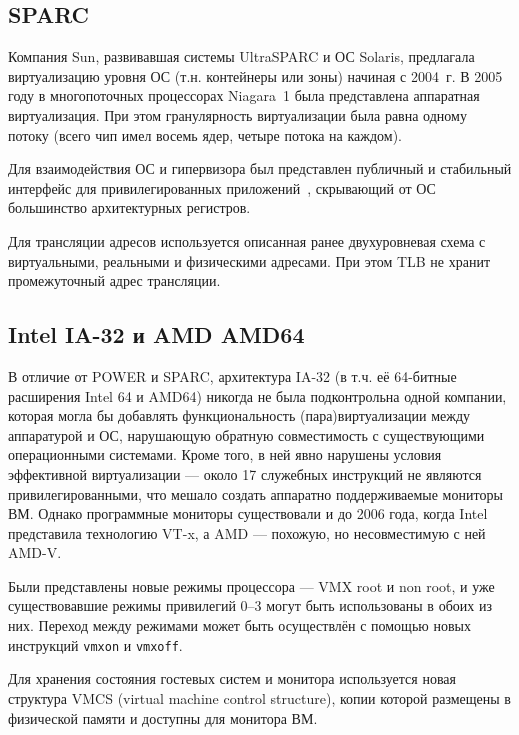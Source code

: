 \subsection{SPARC}

Компания Sun, развивавшая системы UltraSPARC и ОС Solaris, предлагала виртуализацию уровня ОС (т.н. контейнеры или зоны) начиная с 2004~г. В 2005 году в многопоточных процессорах Niagara~1 была представлена аппаратная виртуализация. При этом гранулярность виртуализации была равна одному потоку (всего чип имел восемь ядер, четыре потока на каждом). 

Для взаимодействия ОС и гипервизора был представлен публичный и стабильный интерфейс для привилегированных приложений~\cite{sun4v-spec}, скрывающий от ОС большинство архитектурных регистров.

Для трансляции адресов используется описанная ранее двухуровневая схема с виртуальными, реальными и физическими адресами. При этом TLB не хранит промежуточный адрес трансляции. 

\subsection{Intel IA-32 и AMD AMD64}

В отличие от POWER и SPARC, архитектура IA-32 (в т.ч. её 64-битные расширения Intel 64 и AMD64) никогда не была подконтрольна одной компании, которая могла бы добавлять функциональность (пара)виртуализации между аппаратурой и ОС, нарушающую обратную совместимость с существующими операционными системами. Кроме того, в ней явно нарушены условия эффективной виртуализации — около 17 служебных инструкций не являются привилегированными, что мешало создать аппаратно поддерживаемые мониторы ВМ. Однако программные мониторы существовали и до 2006 года, когда Intel представила технологию VT-x, а AMD — похожую, но несовместимую с ней AMD-V. 

Были представлены новые режимы процессора — VMX root и non root, и уже существовавшие режимы привилегий 0--3 могут быть использованы в обоих из них. Переход между режимами может быть осуществлён с помощью новых инструкций \texttt{vmxon} и \texttt{vmxoff}. 

Для хранения состояния гостевых систем и монитора используется новая структура VMCS (\abbr virtual machine control structure), копии которой размещены в физической памяти и доступны для монитора ВМ.


